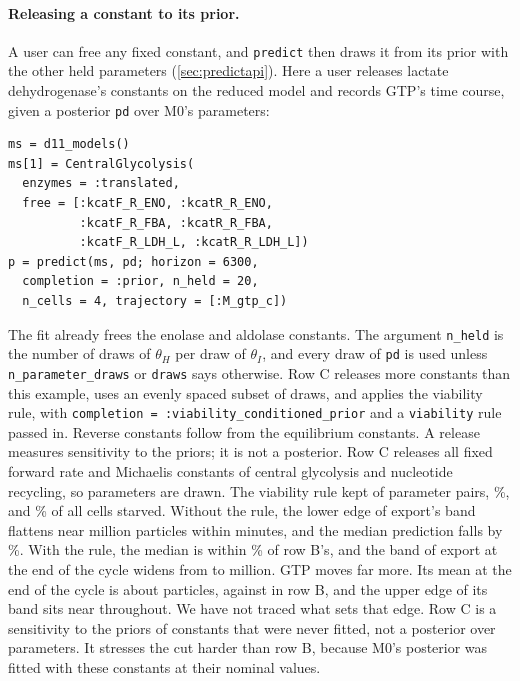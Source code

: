 \paragraph{Releasing a constant to its prior.} A user can free any fixed constant, and
\texttt{predict} then draws it from its prior with the other held parameters
(\cref{sec:predictapi}). Here a user releases lactate dehydrogenase's constants on the reduced
model and records GTP's time course, given a posterior \texttt{pd} over M0's parameters:
{\footnotesize
\begin{verbatim}
ms = d11_models()
ms[1] = CentralGlycolysis(
  enzymes = :translated,
  free = [:kcatF_R_ENO, :kcatR_R_ENO,
          :kcatF_R_FBA, :kcatR_R_FBA,
          :kcatF_R_LDH_L, :kcatR_R_LDH_L])
p = predict(ms, pd; horizon = 6300,
  completion = :prior, n_held = 20,
  n_cells = 4, trajectory = [:M_gtp_c])
\end{verbatim}
}
\noindent The fit already frees the enolase and aldolase constants. The argument
\texttt{n\_held} is the number of draws of $\theta_H$ per draw of $\theta_I$, and every draw
of \texttt{pd} is used unless \texttt{n\_parameter\_draws} or \texttt{draws} says otherwise. Row C
releases more constants than this example, uses an evenly spaced subset of draws, and applies the
viability rule, with \texttt{completion = :viability\_conditioned\_prior} and a
\texttt{viability} rule passed in. Reverse
constants follow from the equilibrium constants. A release measures sensitivity to the
priors; it is not a posterior. Row C releases all  fixed forward rate and
Michaelis constants of central glycolysis and nucleotide recycling, so  parameters are
drawn. The viability rule kept  of  parameter pairs,
\%, and \% of all cells starved. Without the rule, the
lower edge of export's band flattens near  million particles within
minutes, and the median prediction falls by \%. With the rule, the
median is within \% of row B's, and the band of export at the end of
the cycle widens from  to  million. GTP moves far more. Its
mean at the end of the cycle is about  particles, against 
in row B, and the upper edge of its band sits near  throughout. We have
not traced what sets that edge. Row C is a sensitivity to the priors of constants that
were never fitted, not a posterior over  parameters. It stresses the cut
harder than row B, because M0's posterior was fitted with these constants at their
nominal values.
